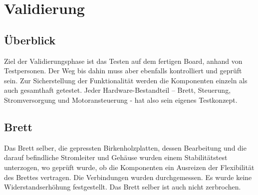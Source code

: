\chapter{Validierung} \label{Validierung}

\section{Überblick} \label{ValidUeberblick}
Ziel der Validierungsphase ist das Testen auf dem fertigen Board, anhand von Testpersonen. Der Weg bis dahin muss aber ebenfalls kontrolliert und geprüft sein. Zur Sicherstellung der Funktionalität werden die Komponenten einzeln als auch gesamthaft getestet. 
Jeder Hardware-Bestandteil – Brett, Steuerung, Stromversorgung und Motoransteuerung - hat also sein eigenes Testkonzept.

\section{Brett} \label{ValidBrett}
Das Brett selber, die gepressten Birkenholzplatten, dessen Bearbeitung und die darauf befindliche Stromleiter und Gehäuse wurden einem Stabilitätstest unterzogen, wo geprüft wurde, ob die Komponenten ein Ausreizen der Flexibilität des Brettes vertragen. Die Verbindungen wurden durchgemessen. Es wurde keine Widerstandserhöhung festgestellt. Das Brett selber ist auch nicht zerbrochen.

